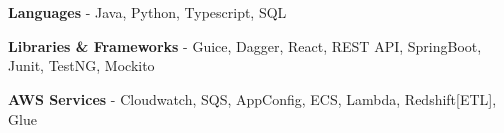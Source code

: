 \newcommand{\skillItem}[2]{
    \textbf{#1} - #2 \\ \vspace{0.2cm}
}

\section{}

\skillItem{Languages}{Java, Python, Typescript, SQL}
\skillItem{Libraries \& Frameworks}{Guice, Dagger, React, REST API, SpringBoot, Junit, TestNG, Mockito}
\skillItem{AWS Services}{Cloudwatch, SQS, AppConfig, ECS, Lambda, Redshift[ETL], Glue}
